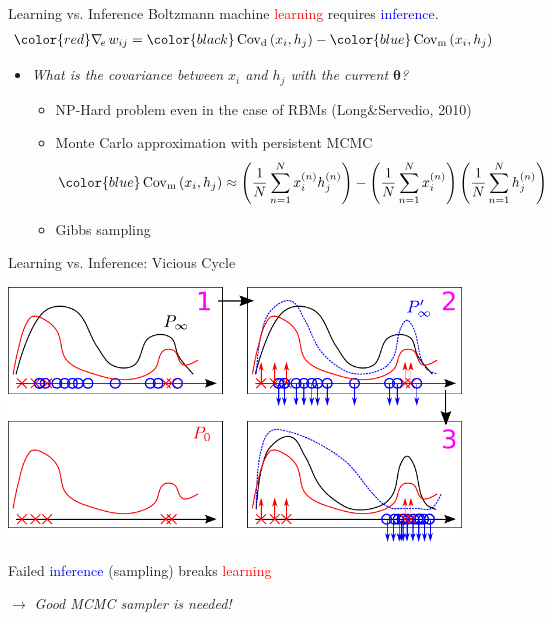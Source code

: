 \documentclass{beamer}
\newcommand{\vects}[1]{\boldsymbol{#1}}
\newcommand{\cov}[0]{\operatorname{Cov}}
\newcommand{\td}[0]{\text{d}}
\newcommand{\tf}[0]{\text{m}}
\newcommand{\TT}[0]{{\vects{\theta}}}
\newcommand{\enhnabla}[0]{\nabla_{\hspace{-0.5mm}e}\,}
\newcommand{\tred}[1]{\textcolor{red}{#1}}
\newcommand{\tblue}[1]{\textcolor{blue}{#1}}
\begin{document}
\begin{frame}{Learning vs. Inference}
    Boltzmann machine \tred{learning} requires
    \tblue{inference}.
    \begin{align*}
        {\color{red} \enhnabla w_{ij}} &= {\color{black}\cov_\td\left(x_i,
        h_j\right)}
        - {\color{blue}\cov_\tf\left(x_i, h_j\right)}
    \end{align*}

    \begin{itemize}
        \item \emph{What is the covariance between $x_i$ and $h_j$ with the
    current $\TT$?} 
    \begin{itemize}
        \item NP-Hard problem even in the case of RBMs {\small (Long\&Servedio, 2010)}
        \item Monte Carlo approximation with persistent MCMC
            \[
            {\color{blue}\cov_\tf\left(x_i, h_j\right)}
            \approx
            \left(\frac{1}{N} \sum_{n=1}^N x_i^{(n)}
            h_j^{(n)}\right) - 
            \left( 
            \frac{1}{N} \sum_{n=1}^N x_i^{(n)} 
            \right)
            \left(\frac{1}{N}
            \sum_{n=1}^N h_j^{(n)}
            \right)
            \]
        \item Gibbs sampling
    \end{itemize}
    \end{itemize}
\end{frame}

\begin{frame}{Learning vs. Inference: Vicious Cycle}

    \begin{center}
        \includegraphics[width=0.9\textwidth]{vicious_cycle_bm.pdf}
    \end{center}

    \raggedright
    Failed \tblue{inference} (sampling) breaks
            \tred{learning} 

    \raggedleft
            $\to$ \emph{Good MCMC sampler is
            needed!}

\end{frame}
\end{document}
